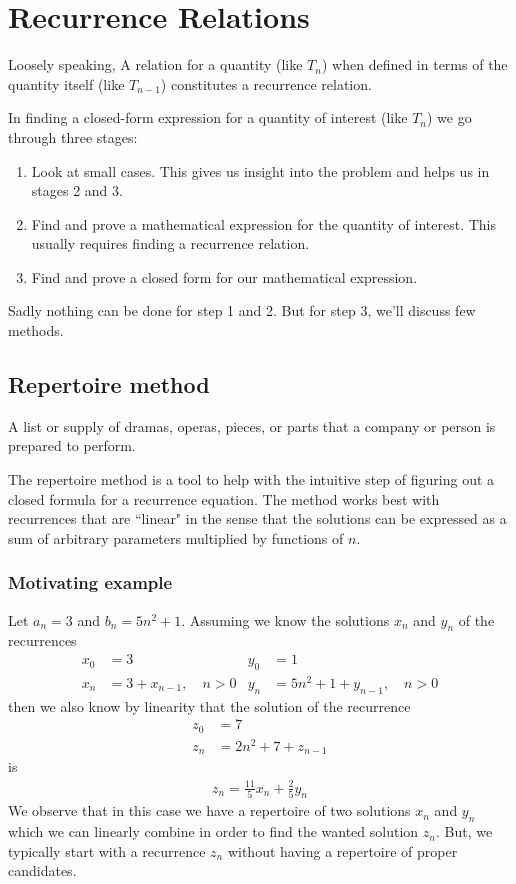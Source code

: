 \chapter {Recurrence Relations}

Loosely speaking, A relation for a quantity (like $T_n$) when defined in terms of the quantity itself (like $T_{n-1}$) constitutes a recurrence relation.

In finding a closed-form expression for a quantity of interest (like $T_n$) we go through three stages:
\begin{enumerate}
    \item Look at small cases. This gives us insight into the problem and helps us
in stages 2 and 3.
    \item Find and prove a mathematical expression for the quantity of interest. This usually requires finding a recurrence relation.
    \item Find and prove a closed form for our mathematical expression.
\end{enumerate}

Sadly nothing can be done for step 1 and 2. But for step 3, we'll discuss few methods.

\section {Repertoire method}
\begin{definition}[Repertoire] A list or supply of dramas, operas, pieces, or parts that a company or person is prepared to perform.
\end{definition}
The repertoire method is a tool to help with the intuitive step of figuring out a closed formula for a recurrence equation. The method works best with recurrences that are ``linear" in the sense that the solutions can be expressed as a sum of arbitrary parameters multiplied by functions of $n$.

\subsection{Motivating example}
Let $a_n=3$ and $b_n=5n^2+1$. Assuming we know the solutions $x_n$ and $y_n$ of the recurrences
\begin{align*}
x_0&=3&y_0&=1\\
x_n&=3+x_{n-1},\quad n>0&y_n&=5n^2+1+y_{n-1},\quad n>0
\end{align*}
then we also know by linearity that the solution of the recurrence
\begin{align*}
z_0&=7\\
z_n&=2n^2+7+z_{n-1}
\end{align*}
is
\begin{align*}
z_n=\frac{11}{5}x_n+\frac{2}{5}y_n
\end{align*}
We observe that in this case we have a repertoire of two solutions $x_n$ and $y_n$ which we can linearly combine in order to find the wanted solution $z_n$. But, we typically start with a recurrence $z_n$ without having a repertoire of proper candidates.

